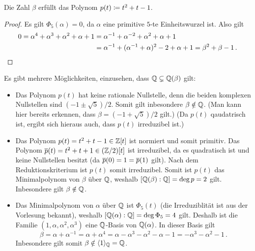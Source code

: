 \begin{claim*}
  Die Zahl $\beta$ erfüllt das Polynom $p(t) \coloneqq t^2 + t - 1$.
\end{claim*}

\begin{proof}
  Es gilt $\Phi_5(\alpha) = 0$, da $\alpha$ eine primitive $5$-te Einheitswurzel ist.
  Also gilt
  \begin{align*}
        0
     =  \alpha^4 + \alpha^3 + \alpha^2 + \alpha + 1
    &=  \alpha^{-1} + \alpha^{-2} + \alpha^2 + \alpha + 1
    \\
    &=  \alpha^{-1} + (\alpha^{-1} + \alpha)^2 - 2 + \alpha + 1
     =  \beta^2 + \beta - 1 \,.
  \qedhere
  \end{align*}
\end{proof}

Es gibt mehrere Möglichkeiten, einzusehen, dass $\mathbb{Q} \subsetneq \mathbb{Q}(\beta)$ gilt:

\begin{itemize}
  \item
    Das Polynom $p(t)$ hat keine rationale Nullstelle, denn die beiden komplexen Nullstellen sind $(-1 \pm \sqrt{5})/2$.
    Somit gilt inbesondere $\beta \notin \mathbb{Q}$.
    (Man kann hier bereits erkennen, dass $\beta = (-1 + \sqrt{5})/2$ gilt.)
    (Da $p(t)$ qaudatrisch ist, ergibt sich hieraus auch, dass $p(t)$ irreduzibel ist.)
  \item
    Das Polynom $p(t) = t^2 + t -1 \in \mathbb{Z}[t]$ ist normiert und somit primitiv.
    Das Polynom $\overline{p}(t) = t^2 + t + 1 \in (\mathbb{Z}/2)[t]$ ist irreduzibel, da es quadratisch ist und keine Nullstellen besitzt (da $\overline{p}(0) = 1 = \overline{p}(1)$ gilt).
    Nach dem Reduktionskriterium ist $p(t)$ somit irreduzibel.
    Somit ist $p(t)$ das Minimalpolynom von $\beta$ über $\mathbb{Q}$, weshalb $[\mathbb{Q}(\beta) : \mathbb{Q}] = \deg p = 2$ gilt.
    Inbesondere gilt $\beta \notin \mathbb{Q}$.
  \item
    Das Minimalpolynom von $\alpha$ über $\mathbb{Q}$ ist $\Phi_5(t)$ (die Irreduziblität ist aus der Vorlesung bekannt), weshalb $[\mathbb{Q}(\alpha) : \mathbb{Q}] = \deg \Phi_5 = 4$ gilt.
    Deshalb ist die Familie $(1, \alpha, \alpha^2, \alpha^3)$ eine $\mathbb{Q}$-Basis von $\mathbb{Q}(\alpha)$.
    In dieser Basis gilt
    \[
        \beta
      = \alpha + \alpha^{-1}
      = \alpha + \alpha^4
      = \alpha -\alpha^3 - \alpha^2 - \alpha - 1
      = -\alpha^3 - \alpha^2 - 1 \,.
    \]
    Inbesondere gilt somit $\beta \notin \langle 1 \rangle_{\mathbb{Q}} = \mathbb{Q}$.
\end{itemize}

